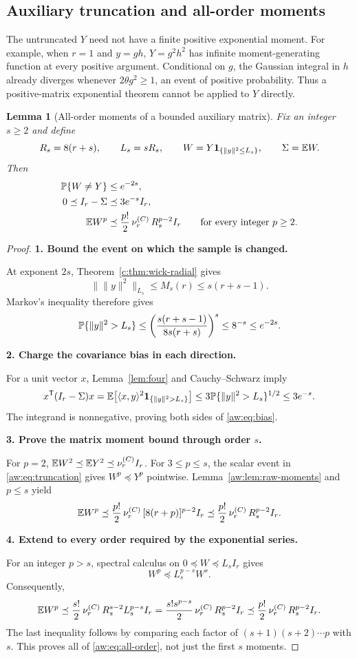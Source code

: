 \documentclass[11pt]{article}
\numberwithin{equation}{section}
\newtheorem{lemma}[theorem]{Lemma}
\theoremstyle{definition}\newtheorem{definition}[theorem]{Definition}
\theoremstyle{remark}\newtheorem{remark}[theorem]{Remark}
\newcommand{\norm}[1]{\lVert#1\rVert}\newcommand{\ip}[2]{\langle#1,#2\rangle}
\newcommand{\one}{\mathbf1}\newcommand{\F}{\mathrm F}
\newcommand{\step}[1]{\par\addvspace{.65\baselineskip}\Needspace{4\baselineskip}\noindent\textbf{#1}\par\nobreak\smallskip}
\begin{document}
\subsection{Auxiliary truncation and all-order moments}
The untruncated $Y$ need not have a finite positive exponential moment. For example,
when $r=1$ and $y=gh$, $Y=g^2h^2$ has infinite moment-generating function at every
positive argument. Conditional on $g$, the Gaussian integral in $h$ already diverges
whenever $2\theta g^2\ge1$, an event of positive probability.
Thus a positive-matrix exponential theorem cannot be applied to $Y$ directly.

\begin{lemma}[All-order moments of a bounded auxiliary matrix]\label{aw:lem:truncate}
Fix an integer $s\ge2$ and define
\begin{equation}\label{aw:eq:truncation}
 R_s=8(r+s),\qquad L_s=sR_s,\qquad
 W=Y\one_{\{\norm y^2\le L_s\}},\qquad\Sigma=\E W.
\end{equation}
Then
\begin{align}
 \mathbb P\{W\ne Y\}&\le e^{-2s},\label{aw:eq:clip}\\
 0\preceq I_r-\Sigma&\preceq3e^{-s}I_r,\label{aw:eq:bias}\\
 \mathbb E W^p&\preceq\frac{p!}{2}\,\nu_r^{(C)}\,R_s^{p-2}I_r
 \qquad\text{for every integer }p\ge2.\label{aw:eq:all-order}
\end{align}
\end{lemma}
\begin{proof}
\step{1. Bound the event on which the sample is changed.}
At exponent $2s$, Theorem~\ref{c:thm:wick-radial} gives
\[
 \bigl\|\norm y^2\bigr\|_{L_s}
 \le M_s(r)\le s(r+s-1).
\]
Markov's inequality therefore gives
\[
 \Prob\{\norm y^2>L_s\}
 \le\left(\frac{s(r+s-1)}{8s(r+s)}\right)^s
 \le8^{-s}\le e^{-2s}.
\]

\step{2. Charge the covariance bias in each direction.}
For a unit vector $x$, Lemma~\ref{lem:four} and Cauchy--Schwarz imply
\[
 x^{\mathsf T}(I_r-\Sigma)x
 =\E\bigl[\ip{x}{y}^2\one_{\{\norm y^2>L_s\}}\bigr]
 \le3\Prob\{\norm y^2>L_s\}^{1/2}\le3e^{-s}.
\]
The integrand is nonnegative, proving both sides of \eqref{aw:eq:bias}.

\step{3. Prove the matrix moment bound through order $s$.}
For $p=2$, $\mathbb E W^2\preceq\mathbb E Y^2\preceq\nu_r^{(C)}I_r$.
For $3\le p\le s$, the scalar event in \eqref{aw:eq:truncation} gives
$W^p\preceq Y^p$ pointwise. Lemma~\ref{aw:lem:raw-moments} and $p\le s$ yield
\[
 \mathbb E W^p\preceq\frac{p!}{2}\,\nu_r^{(C)}\,[8(r+p)]^{p-2}I_r
 \preceq\frac{p!}{2}\,\nu_r^{(C)}\,R_s^{p-2}I_r.
\]

\step{4. Extend to every order required by the exponential series.}
For an integer $p>s$, spectral calculus on $0\preceq W\preceq L_sI_r$ gives
\[
 W^p\preceq L_s^{p-s}W^s.
\]
Consequently,
\[
 \mathbb E W^p\preceq\frac{s!}{2}\,\nu_r^{(C)}\,R_s^{s-2}L_s^{p-s}I_r
 =\frac{s!s^{p-s}}{2}\,\nu_r^{(C)}\,R_s^{p-2}I_r
 \preceq\frac{p!}{2}\,\nu_r^{(C)}\,R_s^{p-2}I_r.
\]
The last inequality follows by comparing each factor of
$(s+1)(s+2)\cdots p$ with $s$. This proves all of \eqref{aw:eq:all-order},
not just the first $s$ moments.
\end{proof}
\end{document}

